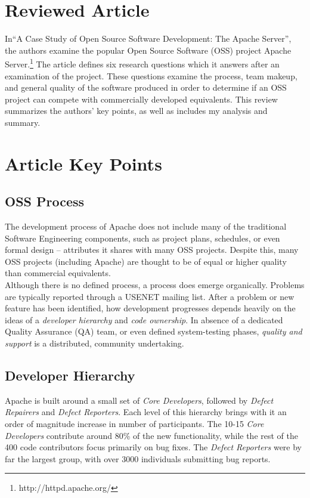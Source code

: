 \documentclass{article}
\begin{document}
\section{Reviewed Article}
In``A Case Study of Open Source Software Development: The Apache Server''\cite{mockus2000case}, the authors examine the popular Open Source Software (OSS) project Apache Server.\footnote{http://httpd.apache.org/} The article defines six research questions which it answers after an examination of the project. These questions examine the process, team makeup, and general quality of the software produced in order to determine if an OSS project can compete with commercially developed equivalents. This review summarizes the authors' key points, as well as includes my analysis and summary.

\section{Article Key Points}

\subsection{OSS Process} The development process of Apache does not include many of the traditional Software Engineering components, such as project plans, schedules, or even formal design -- attributes it shares with many OSS projects\cite{dibona1999open}. Despite this, many OSS projects (including Apache) are thought to be of equal or higher quality than commercial equivalents.\\
Although there is no defined process, a process does emerge organically. Problems are typically reported through a USENET mailing list. After a problem or new feature has been identified, how development progresses depends heavily on the ideas of a {\it developer hierarchy} and {\it code ownership}. In absence of a dedicated Quality Assurance (QA) team, or even defined system-testing phases, {\it quality and support} is a distributed, community undertaking.

\subsection{Developer Hierarchy} Apache is built around a small set of {\it Core Developers}, followed by {\it Defect Repairers} and {\it Defect Reporters}. Each level of this hierarchy brings with it an order of magnitude increase in number of participants. The 10-15 {\it Core Developers} contribute around 80\% of the new functionality, while the rest of the 400 code contributors focus primarily on bug fixes. The {\it Defect Reporters} were by far the largest group, with over 3000 individuals submitting bug reports.
   
\end{document}
